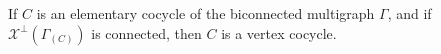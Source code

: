 If $C$ is an elementary cocycle of the biconnected multigraph $\Gamma$, and if $\mathcal{X}^{\perp}(\Gamma_{(C)})$ is connected, then $C$ is a vertex cocycle.
